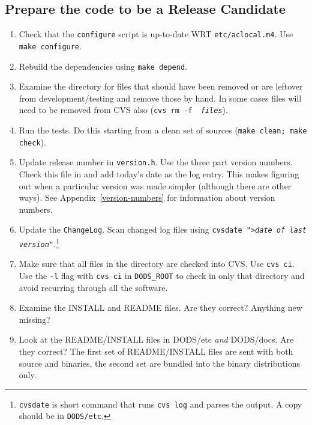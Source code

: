 \documentclass{dods-paper}
\begin{document}
\subsection{Prepare the code to be a Release Candidate}
\label{cvs-prepare}


\begin{enumerate}
\item Check that the \texttt{configure} script is up-to-date WRT
  \texttt{etc/aclocal.m4}. Use \texttt{make configure}.

\item Rebuild the dependencies using \texttt{make depend}.

\item Examine the directory for files that should have been removed or are
  leftover from development/testing and remove those by hand. In some cases
  files will need to be removed from CVS also (\texttt{cvs rm -f {\em
      files}}).

\item Run the tests. Do this starting from a clean set of sources
  (\texttt{make clean; make check}).

\item Update release number in \texttt{version.h}. Use the three part version
  numbers. Check this file in and add today's date as the log entry. This
  makes figuring out when a particular version was made simpler (although
  there are other ways). See Appendix~\ref{version-numbers} for information
  about version numbers.

\item Update the \texttt{ChangeLog}. Scan changed log files using
  \texttt{cvsdate ">{\em date of last version}"}.\footnote{\texttt{cvsdate} is
    short command that runs \texttt{cvs log} and parses the output. A copy
    should be in \texttt{DODS/etc}.}

\item Make sure that all files in the directory are checked into CVS. Use
  \texttt{cvs ci}. Use the \texttt{-l} flag with \texttt{cvs ci} in
  \texttt{DODS\_ROOT} to check in only that directory and avoid recurring
  through all the software.

\item Examine the INSTALL and README files. Are they correct? Anything new
  missing?

\item Look at the README/INSTALL files in DODS/etc {\em and} DODS/docs. Are
  they correct? The first set of README/INSTALL files are sent with both
  source and binaries, the second set are bundled into the binary
  distributions only.
\end{enumerate}
\end{document}
